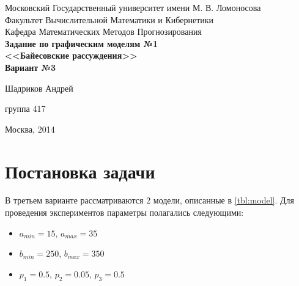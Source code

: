 \documentclass[12pt,a4paper]{article}
\begin{document}
\begin{titlepage}
\begin{center}
  Московский Государственный университет имени М. В. Ломоносова\\
  Факультет Вычислительной Математики и Кибернетики\\
  Кафедра Математических Методов Прогнозирования\\[30mm]

  \Large\bfseries
    Задание по графическим моделям №1\\[5mm]
    <<Байесовские рассуждения>>\\
    Вариант №3
  \\[40mm]
\end{center}
\begin{flushright}
  Шадриков Андрей

  группа 417
\end{flushright}
\center\vspace{\fill} 
  Москва, 2014
\end{titlepage}

\tableofcontents
\newpage

\section{Постановка задачи}

В третьем варианте рассматриваются 2 модели, описанные в \ref{tbl:model}. Для проведения экспериментов параметры полагались следующими:

\begin{itemize}
  \item $a_{min} = 15$, $a_{max} = 35$
  \item $b_{min} = 250$, $b_{max} = 350$
  \item $p_1 = 0.5$, $p_2 = 0.05$, $p_3 = 0.5$
\end{itemize}
\end{document}
